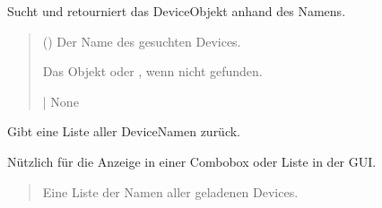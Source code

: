 \documentclass[letterpaper,10pt,english]{sphinxmanual}
\begin{document}
\begin{fulllineitems}
\begin{fulllineitems}
\end{fulllineitems}


\begin{fulllineitems}
\label{\detokenize{modulab/device_manager:modules.device.DeviceManager.DeviceManager.get_device_by_name}}
\pysigstartsignatures
\pysiglinewithargsret
{}
{}
{}
\pysigstopsignatures
\sphinxAtStartPar
Sucht und retourniert das Device\sphinxhyphen{}Objekt anhand des Namens.
\begin{quote}\begin{description}
\sphinxAtStartPar
{} () \textendash{} Der Name des gesuchten Devices.

\sphinxAtStartPar
Das \sphinxhyphen{}Objekt oder , wenn nicht gefunden.

\sphinxAtStartPar
{\hyperref[\detokenize{modulab/device_manager:modules.device.DeviceManager.Device}]{}} | None

\end{description}\end{quote}

\end{fulllineitems}


\begin{fulllineitems}
\label{\detokenize{modulab/device_manager:modules.device.DeviceManager.DeviceManager.list_device_names}}
\pysigstartsignatures
\pysiglinewithargsret
{}
{}
{}
\pysigstopsignatures
\sphinxAtStartPar
Gibt eine Liste aller Device\sphinxhyphen{}Namen zurück.

\sphinxAtStartPar
Nützlich für die Anzeige in einer Combobox oder Liste in der GUI.
\begin{quote}\begin{description}
\sphinxAtStartPar
Eine Liste der Namen aller geladenen Devices.


\end{description}
\end{quote}
\end{fulllineitems}
\end{fulllineitems}
\end{document}

